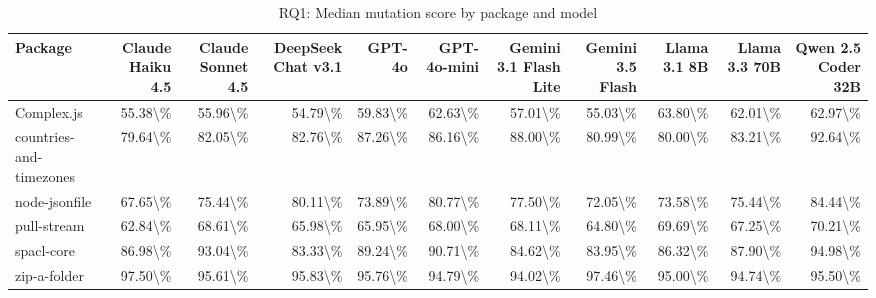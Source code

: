 \begin{table}[htbp]
\centering
{\small
\begin{tabular}{l|rrrrrrrrrr}
\toprule
\textbf{Package} & \textbf{Claude Haiku 4.5} & \textbf{Claude Sonnet 4.5} & \textbf{DeepSeek Chat v3.1} & \textbf{GPT-4o} & \textbf{GPT-4o-mini} & \textbf{Gemini 3.1 Flash Lite} & \textbf{Gemini 3.5 Flash} & \textbf{Llama 3.1 8B} & \textbf{Llama 3.3 70B} & \textbf{Qwen 2.5 Coder 32B} \\
\midrule
Complex.js & 55.38\textbackslash{}\% & 55.96\textbackslash{}\% & 54.79\textbackslash{}\% & 59.83\textbackslash{}\% & 62.63\textbackslash{}\% & 57.01\textbackslash{}\% & 55.03\textbackslash{}\% & 63.80\textbackslash{}\% & 62.01\textbackslash{}\% & 62.97\textbackslash{}\% \\
countries-and-timezones & 79.64\textbackslash{}\% & 82.05\textbackslash{}\% & 82.76\textbackslash{}\% & 87.26\textbackslash{}\% & 86.16\textbackslash{}\% & 88.00\textbackslash{}\% & 80.99\textbackslash{}\% & 80.00\textbackslash{}\% & 83.21\textbackslash{}\% & 92.64\textbackslash{}\% \\
node-jsonfile & 67.65\textbackslash{}\% & 75.44\textbackslash{}\% & 80.11\textbackslash{}\% & 73.89\textbackslash{}\% & 80.77\textbackslash{}\% & 77.50\textbackslash{}\% & 72.05\textbackslash{}\% & 73.58\textbackslash{}\% & 75.44\textbackslash{}\% & 84.44\textbackslash{}\% \\
pull-stream & 62.84\textbackslash{}\% & 68.61\textbackslash{}\% & 65.98\textbackslash{}\% & 65.95\textbackslash{}\% & 68.00\textbackslash{}\% & 68.11\textbackslash{}\% & 64.80\textbackslash{}\% & 69.69\textbackslash{}\% & 67.25\textbackslash{}\% & 70.21\textbackslash{}\% \\
spacl-core & 86.98\textbackslash{}\% & 93.04\textbackslash{}\% & 83.33\textbackslash{}\% & 89.24\textbackslash{}\% & 90.71\textbackslash{}\% & 84.62\textbackslash{}\% & 83.95\textbackslash{}\% & 86.32\textbackslash{}\% & 87.90\textbackslash{}\% & 94.98\textbackslash{}\% \\
zip-a-folder & 97.50\textbackslash{}\% & 95.61\textbackslash{}\% & 95.83\textbackslash{}\% & 95.76\textbackslash{}\% & 94.79\textbackslash{}\% & 94.02\textbackslash{}\% & 97.46\textbackslash{}\% & 95.00\textbackslash{}\% & 94.74\textbackslash{}\% & 95.50\textbackslash{}\% \\
\bottomrule
\end{tabular}
}
\caption{RQ1: Median mutation score by package and model}
\label{tab:rq1-package-breakdown}
\end{table}